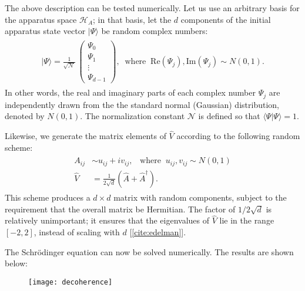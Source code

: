 \documentclass[pra,12pt]{revtex4}
\begin{document}
The above description can be tested numerically.  Let us use an
arbitrary basis for the apparatus space $\mathscr{H}_A$; in that
basis, let the $d$ components of the initial apparatus state vector
$|\Psi\rangle$ be random complex numbers:
\begin{align}
  \begin{aligned}
  |\Psi\rangle = \frac{1}{\sqrt{\mathcal{N}}}\, \begin{pmatrix}\Psi_0 \\ \Psi_1 \\ \vdots \\ \Psi_{d-1}
  \end{pmatrix}, \;\; \mathrm{where} \;\; \mathrm{Re}(\Psi_j), \mathrm{Im}(\Psi_j) \sim N(0,1).
  \end{aligned}
\end{align}
In other words, the real and imaginary parts of each complex number
$\Psi_j$ are independently drawn from the the standard normal
(Gaussian) distribution, denoted by $N(0,1)$.  The normalization
constant $\mathcal{N}$ is defined so that $\langle\Psi|\Psi\rangle =
1$.

Likewise, we generate the matrix elements of $\hat{V}$ according to
the following random scheme:
\begin{align}
  \begin{aligned}A_{ij} &\sim u_{ij} + i v_{ij}, \;\;\;\mathrm{where}\;\;u_{ij},v_{ij}\sim N(0,1)\\ \hat{V} &= \frac{1}{2\sqrt{d}} \left(\hat{A} + \hat{A}^\dagger\right).\end{aligned}
\end{align}
This scheme produces a $d\times d$ matrix with random components,
subject to the requirement that the overall matrix be Hermitian.  The
factor of $1/2\sqrt{d}$ is relatively unimportant; it ensures that the
eigenvalues of $\hat{V}$ lie in the range $[-2,2]$, instead of scaling
with $d$ [\ref{cite:edelman}].

The Schr\"odinger equation can now be solved numerically.  The results
are shown below:

\begin{figure}[h]
  \centering\texttt{[image: decoherence]}
\end{figure}
\end{document}
